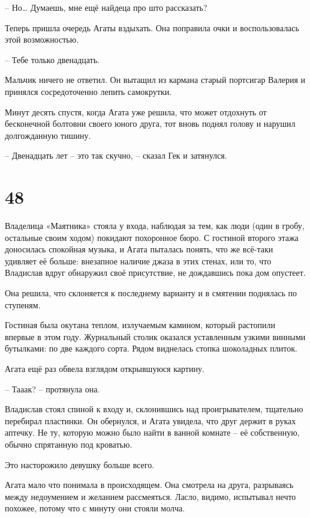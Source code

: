 \documentclass[
  a5paperpaper,
  DIV=11,
  numbers=noendperiod]{scrreprt}
\begin{document}
-- Но\ldots{} Думаешь, мне ещё найдеца про што рассказать?

Теперь пришла очередь Агаты вздыхать. Она поправила очки и
воспользовалась этой возможностью.

-- Тебе только двенадцать.

Мальчик ничего не ответил. Он вытащил из кармана старый портсигар
Валерия и принялся сосредоточенно лепить самокрутки.

Минут десять спустя, когда Агата уже решила, что может отдохнуть от
бесконечной болтовни своего юного друга, тот вновь поднял голову и
нарушил долгожданную тишину.

-- Двенадцать лет -- это так скучно, -- сказал Гек и затянулся.

\section*{48}\label{48}


Владелица «Маятника» стояла у входа, наблюдая за тем, как люди (один в
гробу, остальные своим ходом) покидают похоронное бюро. С гостиной
второго этажа доносилась спокойная музыка, и Агата пыталась понять, что
же всё-таки удивляет её больше: внезапное наличие джаза в этих стенах,
или то, что Владислав вдруг обнаружил своё присутствие, не дождавшись
пока дом опустеет.

Она решила, что склоняется к последнему варианту и в смятении поднялась
по ступеням.

Гостиная была окутана теплом, излучаемым камином, который растопили
впервые в этом году. Журнальный столик оказался уставленным узкими
винными бутылками: по две каждого сорта. Рядом виднелась стопка
шоколадных плиток.

Агата ещё раз обвела взглядом открывшуюся картину.

-- Тааак? -- протянула она.

Владислав стоял спиной к входу и, склонившись над проигрывателем,
тщательно перебирал пластинки. Он обернулся, и Агата увидела, что друг
держит в руках аптечку. Не ту, которую можно было найти в ванной комнате
-- её собственную, обычно спрятанную под кроватью.

Это насторожило девушку больше всего.

Агата мало что понимала в происходящем. Она смотрела на друга,
разрываясь между недоумением и желанием рассмеяться. Ласло, видимо,
испытывал нечто похожее, потому что с минуту они стояли молча.
\end{document}
